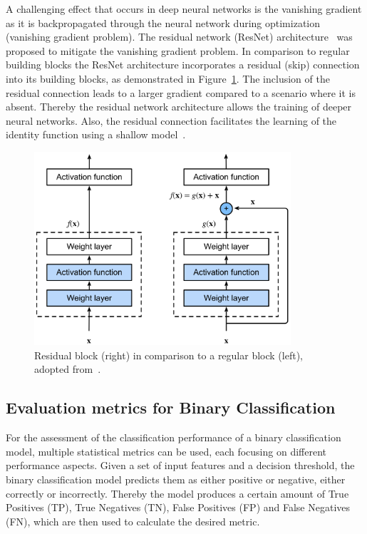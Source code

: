 A challenging effect that occurs in deep neural networks is the vanishing gradient 
as it is backpropagated through the neural network during optimization (vanishing gradient problem).
The residual network (ResNet) architecture~\citep{He2016} was proposed to mitigate the vanishing gradient problem.
In comparison to regular building blocks the ResNet architecture incorporates a residual (skip) connection 
into its building blocks, as demonstrated in Figure~\ref{fig:normal_and_residual_layer}.
The inclusion of the residual connection leads to a larger gradient compared to a scenario where it is absent.
Thereby the residual network architecture allows the training of deeper neural networks.
Also, the residual connection facilitates the learning of the identity function using a shallow model~\citep{He2016}.

\begin{figure}[ht]
  \centering
  \includegraphics[width=0.85\textwidth]{content/figures/residual_block.png}
  \caption{Residual block (right) in comparison to a regular block (left), adopted from~\cite{Zhang2023}.} 
  \label{fig:normal_and_residual_layer}
\end{figure}


\subsection{Evaluation metrics for Binary Classification}

For the assessment of the classification performance of a binary classification model,
multiple statistical metrics can be used, each focusing on different performance aspects.
Given a set of input features and a decision threshold, 
the binary classification model predicts them as either positive or negative, either correctly or incorrectly.
Thereby the model produces a certain amount of True Positives (TP), True Negatives (TN), False Positives (FP)
and False Negatives (FN), which are then used to calculate the desired metric.


